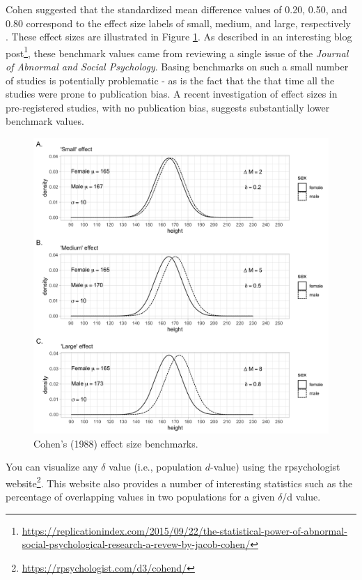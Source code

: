 \documentclass[
]{krantz}
\renewcommand{\href}[2]{#2\footnote{\url{#1}}}
\begin{document}
Cohen suggested that the standardized mean difference values of 0.20, 0.50, and 0.80 correspond to the effect size labels of small, medium, and large, respectively \citep{cohen1988}. These effect sizes are illustrated in Figure \ref{fig:dex4}. As described in an interesting \href{https://replicationindex.com/2015/09/22/the-statistical-power-of-abnormal-social-psychological-research-a-revew-by-jacob-cohen/}{blog post}, these benchmark values came from reviewing a single issue of the \emph{Journal of Abnormal and Social Psychology}. Basing benchmarks on such a small number of studies is potentially problematic - as is the fact that the that time all the studies were prone to publication bias. A recent investigation \citep[see][]{schafer2019meaningfulness} of effect sizes in pre-registered studies, with no publication bias, suggests substantially lower benchmark values.

\begin{figure}
\includegraphics[width=1\linewidth]{ch_populations/images/dvalue_ex4} \caption{Cohen's (1988) effect size benchmarks.}\label{fig:dex4}
\end{figure}

You can visualize any \(\delta\) value (i.e., population \(d\)-value) using the rpsychologist \href{https://rpsychologist.com/d3/cohend/}{website}. This website also provides a number of interesting statistics such as the percentage of overlapping values in two populations for a given \(\delta\)/d value.
\end{document}
